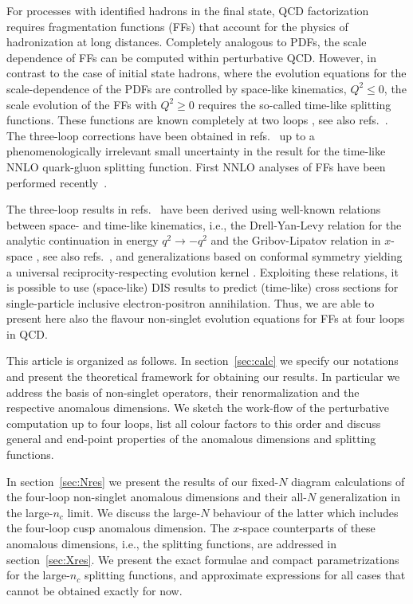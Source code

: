 \documentclass[12pt]{article}
\def\nc{{n_c}}
\begin{document}
For processes with identified hadrons in the final state, QCD factorization 
requires fragmentation functions (FFs) that account for the physics of 
hadronization at long distances.  Completely analogous to PDFs, the scale 
dependence of FFs can be computed within perturbative QCD.
However, in contrast to the case of initial state hadrons, where the 
evolution equations for the scale-dependence of the PDFs are controlled by 
space-like kinematics, $Q^2 \le 0$, the scale evolution of the FFs with 
$Q^2 \ge 0$ requires the so-called time-like splitting functions.
These functions are known completely at two loops
\cite{Curci:1980uw,Furmanski:1980cm,Floratos:1981hs,Kalinowski:1980wea,%
Kalinowski:1980ju,Munehisa:1981ke}, see also 
refs.~\cite{Mitov:2006wy,Gituliar:2015iyq}.
%
The three-loop corrections have been obtained in refs.~\cite{Mitov:2006ic,%
Moch:2007tx,Almasy:2011eq} up to a phenomenologically irrelevant small 
uncertainty in the result for the time-like NNLO quark-gluon splitting 
function. 
First NNLO analyses of FFs have been performed 
recently~\cite{Anderle:2015lqa,Bertone:2017tyb}.

The three-loop results in refs.~\cite{Mitov:2006ic,Moch:2007tx,Almasy:2011eq} 
have been derived using well-known relations between space- and time-like
kinematics, i.e., the Drell-Yan-Levy relation for the analytic continuation 
in energy $q^2 \to -q^2$ and the Gribov-Lipatov relation in $x$-space 
\cite{Gribov:1972ri,Gribov:1972rt}, 
see also refs.~\cite{Stratmann:1996hn,Blumlein:2000wh},
and generalizations based on conformal symmetry yielding a universal 
reciprocity-respecting evolution kernel 
\cite{Dokshitzer:2005bf,Dokshitzer:2006nm,Basso:2006nk}.
Exploiting these relations, it is possible to use (space-like) DIS results to
predict (time-like) cross sections for single-particle inclusive
electron-positron annihilation. 
Thus, we are able to present here also the flavour non-singlet evolution
equations for FFs at four loops in QCD.

This article is organized as follows. In section~\ref{sec:calc} we specify
our notations and present the theoretical framework for obtaining our results.
In particular we address the basis of non-singlet operators, their 
renormalization and the respective anomalous dimensions.
We sketch the work-flow of the perturbative computation up to four loops, list 
all colour factors to this order and discuss general and end-point properties 
of the anomalous dimensions and splitting functions.

\vspace*{-0.5mm}
In section~\ref{sec:Nres} we present the results of our fixed-$N$ diagram 
calculations of the four-loop non-singlet anomalous dimensions and their 
all-$N$ generalization in the large-$\nc$ limit. We discuss the large-$N$ 
behaviour of the latter which includes the four-loop cusp anomalous dimension.
The \mbox{$x$-space} counterparts of these anomalous dimensions, i.e., the 
splitting functions, are addressed in section~\ref{sec:Xres}. 
We present the exact formulae and compact parametrizations for 
the large-$\nc$ splitting functions, and approximate expressions for 
all cases that cannot be obtained exactly for now.
 
\end{document}
